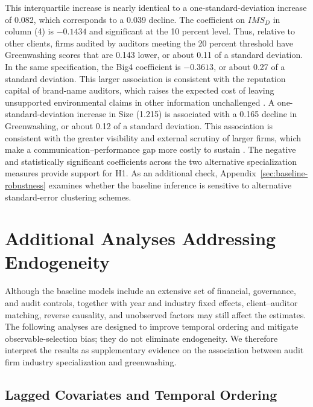 \documentclass[11pt]{article}
\begin{document}
This interquartile increase is nearly identical to a one-standard-deviation increase of 0.082, which corresponds to a 0.039 decline. 
The coefficient on \(IMS_D\) in column (4) is \(-0.1434\) and significant at the 10 percent level. 
Thus, relative to other clients, firms audited by auditors meeting the 20 percent threshold have Greenwashing scores that are 0.143 lower, or about 0.11 of a standard deviation. 
In the same specification, the Big4 coefficient is \(-0.3613\), or about 0.27 of a standard deviation. 
This larger association is consistent with the reputation capital of brand-name auditors, which raises the expected cost of leaving unsupported environmental claims in other information unchallenged \citep{defond2014review}. 
A one-standard-deviation increase in Size (1.215) is associated with a 0.165 decline in Greenwashing, or about 0.12 of a standard deviation. 
This association is consistent with the greater visibility and external scrutiny of larger firms, which make a communication--performance gap more costly to sustain \citep{marquis2016scrutiny}. 
The negative and statistically significant coefficients across the two alternative specialization measures provide support for H1. As an additional check, Appendix~\ref{sec:baseline-robustness} examines whether the baseline inference is sensitive to alternative standard-error clustering schemes.

\clearpage

\clearpage

\clearpage

\clearpage

\section{Additional Analyses Addressing Endogeneity}

Although the baseline models include an extensive set of financial, governance, and audit controls, 
together with year and industry fixed effects, client--auditor matching, reverse causality, and unobserved factors may still affect the estimates.
The following analyses are designed to improve temporal ordering and mitigate observable-selection bias; they do not eliminate endogeneity. 
We therefore interpret the results as supplementary evidence on the association between audit firm industry specialization and greenwashing.

\subsection{Lagged Covariates and Temporal Ordering}
\end{document}

